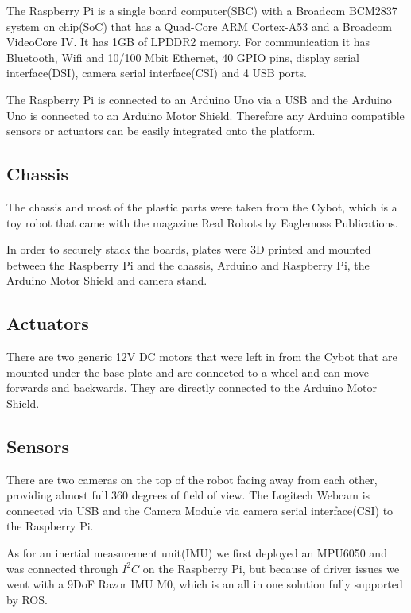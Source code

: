 \documentclass[class=article, crop=false]{standalone}
\begin{document}
The Raspberry Pi is a single board computer(SBC) with a Broadcom BCM2837 system on chip(SoC) that has a Quad-Core ARM Cortex-A53 and a Broadcom VideoCore IV. It has 1GB of LPDDR2 memory. For communication it has Bluetooth, Wifi and 10/100 Mbit Ethernet, 40 GPIO pins, display serial interface(DSI), camera serial interface(CSI) and 4 USB ports\footnotemark.


The Raspberry Pi is connected to an Arduino Uno via a USB and the Arduino Uno is connected to an Arduino Motor Shield. Therefore any Arduino compatible sensors or actuators can be easily integrated onto the platform.

\subsection{Chassis}\label{subsec:chassis}
The chassis and most of the plastic parts were taken from the Cybot, which is a toy robot that came with the magazine Real Robots by Eaglemoss Publications\footnotemark.


In order to securely stack the boards, plates were 3D printed and mounted between the Raspberry Pi and the chassis, Arduino and Raspberry Pi, the Arduino Motor Shield and camera stand.

\subsection{Actuators}\label{subsec:actuators}
There are two generic 12V DC motors that were left in from the Cybot that are mounted under the base plate and are connected to a wheel and can move forwards and backwards. They are directly connected to the Arduino Motor Shield.

\subsection{Sensors}\label{subsec:sensors}
There are two cameras on the top of the robot facing away from each other, providing almost full 360 degrees of field of view. The Logitech Webcam is connected via USB and the Camera Module via camera serial interface(CSI) to the Raspberry Pi.

As for an inertial measurement unit(IMU) we first deployed an MPU6050 and was connected through $ I^2C $ on the Raspberry Pi, but because of driver issues we went with a 9DoF Razor IMU M0, which is an all in one solution fully supported by ROS.
\end{document}
